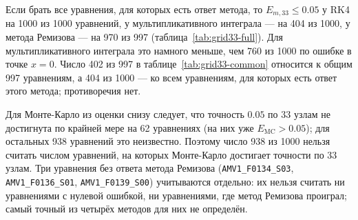 \documentclass[14pt,a4paper]{extarticle}
\begin{document}
Если брать все уравнения, для которых есть ответ метода, то
$E_{m,33}\le0.05$ у RK4 на 1000 из 1000 уравнений, у мультипликативного
интеграла --- на 404 из 1000, у метода Ремизова --- на 970 из 997
(таблица~\ref{tab:grid33-full}). Для мультипликативного интеграла это
намного меньше, чем 760 из 1000 по ошибке в точке $x=0$. Число 402 из 997
в таблице~\ref{tab:grid33-common} относится к общим 997 уравнениям,
а 404 из 1000 --- ко всем уравнениям, для которых есть ответ этого
метода; противоречия нет.

\begin{table}[!htbp]
\centering
\caption{Все уравнения, для которых есть ответ метода. Для Монте-Карло
приведена только ошибка в точке $x=0$ --- оценка снизу
для $E_{\mathrm{MC},33}$, а не сама $E_{\mathrm{MC},33}$.}
\label{tab:grid33-full}
\end{table}

Для Монте-Карло из оценки снизу следует, что точность $0.05$ по 33 узлам
не достигнута по крайней мере на 62 уравнениях (на них уже
$E_{\mathrm{MC}}>0.05$); для остальных 938 уравнений это неизвестно.
Поэтому число 938 из 1000 нельзя считать числом уравнений, на которых
Монте-Карло достигает точности по 33 узлам. Три уравнения без ответа
метода Ремизова (\texttt{AMV1\_F0134\_S03}, \texttt{AMV1\_F0136\_S01},
\texttt{AMV1\_F0139\_S00}) учитываются отдельно: их нельзя считать
ни уравнениями с нулевой ошибкой, ни уравнениями, где метод Ремизова
проиграл; самый точный из четырёх методов для них не определён.
\end{document}

